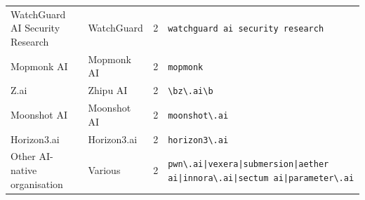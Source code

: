 \begin{longtable}{p{}p{}p{}p{}}
WatchGuard AI Security Research & WatchGuard & 2 & \texttt{watchguard ai security research} \\
Mopmonk AI & Mopmonk AI & 2 & \texttt{mopmonk} \\
Z.ai & Zhipu AI & 2 & \texttt{\textbackslash{}bz\textbackslash{}.ai\textbackslash{}b} \\
Moonshot AI & Moonshot AI & 2 & \texttt{moonshot\textbackslash{}.ai} \\
Horizon3.ai & Horizon3.ai & 2 & \texttt{horizon3\textbackslash{}.ai} \\
Other AI-native organisation & Various & 2 & \texttt{pwn\textbackslash{}.ai|\allowbreak{}vexera|\allowbreak{}submersion|\allowbreak{}aether ai|\allowbreak{}innora\textbackslash{}.ai|\allowbreak{}sectum ai|\allowbreak{}parameter\textbackslash{}.ai} \\
\end{longtable}
